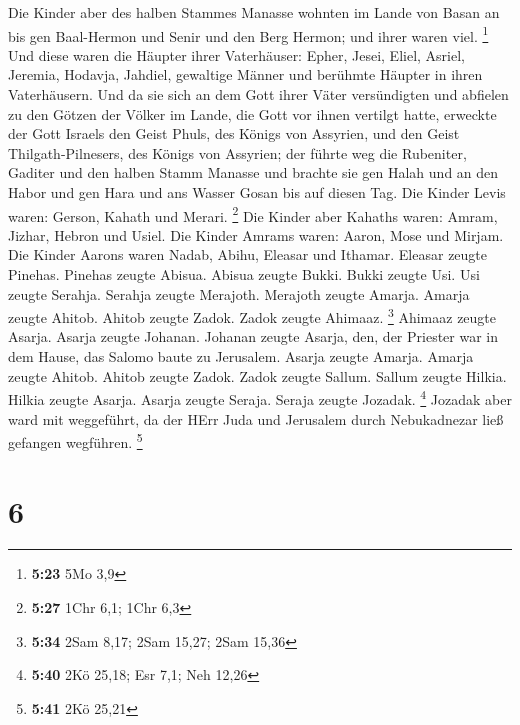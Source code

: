  Die Kinder aber des halben Stammes Manasse wohnten im
Lande von Basan an bis gen Baal-Hermon und Senir und den Berg Hermon;
und ihrer waren viel. \footnote{\textbf{5:23} 5Mo 3,9}  Und
diese waren die Häupter ihrer Vaterhäuser: Epher, Jesei, Eliel, Asriel,
Jeremia, Hodavja, Jahdiel, gewaltige Männer und berühmte Häupter in
ihren Vaterhäusern.  Und da sie sich an dem Gott ihrer
Väter versündigten und abfielen zu den Götzen der Völker im Lande, die
Gott vor ihnen vertilgt hatte,  erweckte der Gott Israels
den Geist Phuls, des Königs von Assyrien, und den Geist
Thilgath-Pilnesers, des Königs von Assyrien; der führte weg die
Rubeniter, Gaditer und den halben Stamm Manasse und brachte sie gen
Halah und an den Habor und gen Hara und ans Wasser Gosan bis auf diesen
Tag.  Die Kinder Levis waren: Gerson, Kahath und Merari.
\footnote{\textbf{5:27} 1Chr 6,1; 1Chr 6,3}  Die Kinder
aber Kahaths waren: Amram, Jizhar, Hebron und Usiel.  Die
Kinder Amrams waren: Aaron, Mose und Mirjam. Die Kinder Aarons waren
Nadab, Abihu, Eleasar und Ithamar.  Eleasar zeugte Pinehas.
Pinehas zeugte Abisua.  Abisua zeugte Bukki. Bukki zeugte
Usi.  Usi zeugte Serahja. Serahja zeugte Merajoth.
 Merajoth zeugte Amarja. Amarja zeugte Ahitob.
 Ahitob zeugte Zadok. Zadok zeugte Ahimaaz. \footnote{\textbf{5:34}
  2Sam 8,17; 2Sam 15,27; 2Sam 15,36}  Ahimaaz zeugte
Asarja. Asarja zeugte Johanan.  Johanan zeugte Asarja, den,
der Priester war in dem Hause, das Salomo baute zu Jerusalem.
 Asarja zeugte Amarja. Amarja zeugte Ahitob. 
Ahitob zeugte Zadok. Zadok zeugte Sallum.  Sallum zeugte
Hilkia. Hilkia zeugte Asarja.  Asarja zeugte Seraja. Seraja
zeugte Jozadak. \footnote{\textbf{5:40} 2Kö 25,18; Esr 7,1; Neh 12,26}
 Jozadak aber ward mit weggeführt, da der HErr Juda und
Jerusalem durch Nebukadnezar ließ gefangen wegführen. \footnote{\textbf{5:41}
  2Kö 25,21}

\hypertarget{section-3}{%
\section{6}\label{section-3}}


